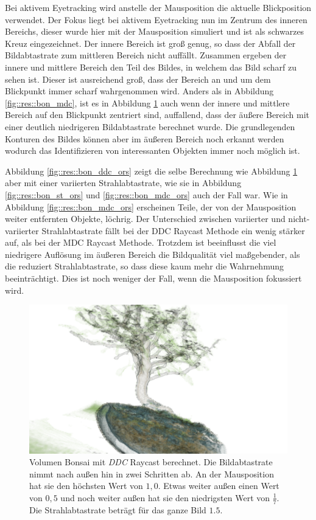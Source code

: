 Bei aktivem Eyetracking wird anstelle der Mausposition die aktuelle Blickposition verwendet.
Der Fokus liegt bei aktivem Eyetracking nun im Zentrum des inneren Bereichs, dieser wurde hier mit der Mausposition simuliert und ist als schwarzes Kreuz eingezeichnet.
Der innere Bereich ist groß genug, so dass der Abfall der Bildabtastrate zum mittleren Bereich nicht auffällt.
Zusammen ergeben der innere und mittlere Bereich den Teil des Bildes, in welchem das Bild scharf zu sehen ist.
Dieser ist ausreichend groß, dass der Bereich an und um dem Blickpunkt immer scharf wahrgenommen wird.
Anders als in Abbildung \ref{fig::res::bon_mdc}, ist es in Abbildung \ref{fig::res::bon_ddc} auch wenn der innere und mittlere Bereich auf den Blickpunkt zentriert sind, auffallend, dass der äußere Bereich mit einer deutlich niedrigeren Bildabtastrate berechnet wurde.
Die grundlegenden Konturen des Bildes können aber im äußeren Bereich noch erkannt werden wodurch das Identifizieren von interessanten Objekten immer noch möglich ist.

Abbildung \ref{fig::res::bon_ddc_ors} zeigt die selbe Berechnung wie Abbildung \ref{fig::res::bon_ddc} aber mit einer variierten Strahlabtastrate, wie sie in Abbildung \ref{fig::res::bon_st_ors} und \ref{fig::res::bon_mdc_ors} auch der Fall war.
Wie in Abbildung \ref{fig::res::bon_mdc_ors} erscheinen Teile, der von der Mausposition weiter entfernten Objekte, löchrig.
Der Unterschied zwischen variierter und nicht-variierter Strahlabtastrate fällt bei der DDC Raycast Methode ein wenig stärker auf, als bei der MDC Raycast Methode.
Trotzdem ist beeinflusst die viel niedrigere Auflösung im äußeren Bereich die Bildqualität viel maßgebender, als die reduziert Strahlabtastrate, so dass diese kaum mehr die Wahrnehmung beeinträchtigt.
Dies ist noch weniger der Fall, wenn die Mausposition fokussiert wird.

\begin{landscape}
	\begin{figure}
		\centering
		\includegraphics[width=1\textheight]{../../Neue_Messungen/Bonsai/ddc.png}
		\caption{Volumen Bonsai mit \emph{DDC} Raycast berechnet. Die Bildabtastrate nimmt nach außen hin in zwei Schritten ab. An der Mausposition hat sie den höchsten Wert von $1,0$. Etwas weiter außen einen Wert von $0,5$ und noch weiter außen hat sie den niedrigsten Wert von $\frac{1}{7}$. Die Strahlabtastrate beträgt für das ganze Bild $1.5$.}
		\label{fig::res::bon_ddc}
	\end{figure}
\end{landscape}

